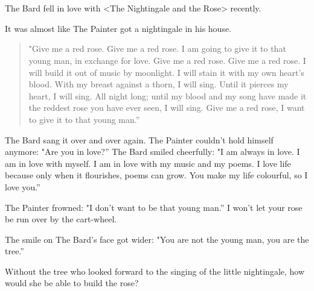 \documentclass{article}
\begin{document}
\section{} %
\par The Bard fell in love with <The Nightingale and the Rose> recently.
\par It was almost like The Painter got a nightingale in his house.
\begin{quote}
"Give me a red rose. Give me a red rose. I am going to give it to that young man, in exchange for love. Give me a red rose. Give me a red rose. I will build it out of music by moonlight. I will stain it with my own heart's blood. With my breast against a thorn, I will sing. Until it pierces my heart, I will sing. All night long; until my blood and my song have made it the reddest rose you have ever seen, I will sing.
Give me a red rose, I want to give it to that young man.”
\end{quote}
\par The Bard sang it over and over again.
The Painter couldn't hold himself anymore: "Are you in love?”
The Bard smiled cheerfully: "I am always in love. I am in love with myself. I am in love with my music and my poems. I love life because only when it flourishes, poems can grow. You make my life colourful, so I love you.”
\par The Painter frowned: "I don't want to be that young man.” I won't let your rose be run over by the cart-wheel.
\par The smile on The Bard's face got wider: "You are not the young man, you are the tree.”
\par Without the tree who looked forward to the singing of the little nightingale, how would she be able to build the rose?
\end{document}
